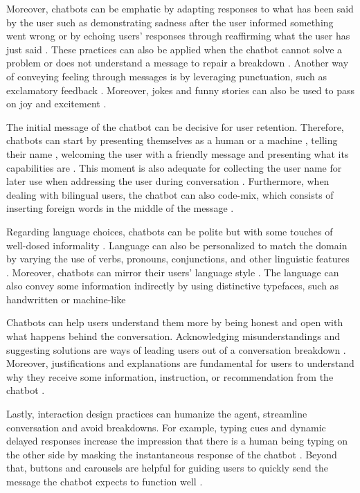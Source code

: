 Moreover, chatbots can be emphatic by adapting responses to what has been said by the user  such as demonstrating sadness after the user informed something went wrong or by echoing users' responses through reaffirming what the user has just said . These practices can also be applied when the chatbot cannot solve a problem or does not understand a message to repair a breakdown . Another way of conveying feeling through messages is by leveraging punctuation, such as exclamatory feedback . Moreover, jokes and funny stories can also be used to pass on joy and excitement .

The initial message of the chatbot can be decisive for user retention. Therefore, chatbots can start by presenting themselves as a human or a machine , telling their name , welcoming the user with a friendly message  and presenting what its capabilities are . This moment is also adequate for collecting the user name for later use when addressing the user during conversation . Furthermore, when dealing with bilingual users, the chatbot can also code-mix, which consists of inserting foreign words in the middle of the message .

Regarding language choices, chatbots can be polite  but with some touches of well-dosed informality . Language can also be personalized to match the domain by varying the use of verbs, pronouns, conjunctions, and other linguistic features . Moreover, chatbots can mirror their users' language style . The language can also convey some information indirectly by using distinctive typefaces, such as handwritten or machine-like  

Chatbots can help users understand them more by being honest and open with what happens behind the conversation. Acknowledging misunderstandings and suggesting solutions are ways of leading users out of a conversation breakdown . Moreover, justifications and explanations are fundamental for users to understand why they receive some information, instruction, or recommendation from the chatbot .

Lastly, interaction design practices can humanize the agent, streamline conversation and avoid breakdowns. For example, typing cues and dynamic delayed responses increase the impression that there is a human being typing on the other side by masking the instantaneous response of the chatbot . Beyond that, buttons and carousels are helpful for guiding users to quickly send the message the chatbot expects to function well .


